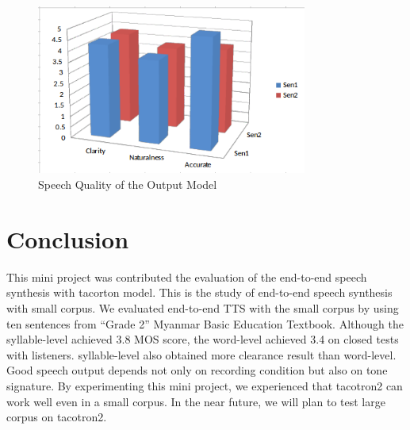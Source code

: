 \documentclass[journal,transmag]{JIISTjrnl}
\newcommand{\quotes}[1]{``#1''}
\begin{document}
\begin{figure}[H]
\centering
\includegraphics[width=3.5in]{mos.png}
\caption{Speech Quality of the Output Model}
\label{Fig:7}
\end{figure}

\section{Conclusion}
This mini project was contributed the evaluation of the end-to-end speech synthesis with tacorton model. This is the study of end-to-end speech synthesis with small corpus. We evaluated end-to-end TTS with the small corpus by using ten sentences  from \quotes{Grade 2} Myanmar Basic Education Textbook. Although the syllable-level achieved 3.8 MOS score, the word-level achieved 3.4 on closed tests with listeners. syllable-level also obtained more clearance result than word-level. Good speech output depends not only on recording condition but also on tone signature. By experimenting this mini project, we experienced that tacotron2 can work well even in a small corpus. In the near future, we will plan to test large corpus on tacotron2.



%
\end{document}
